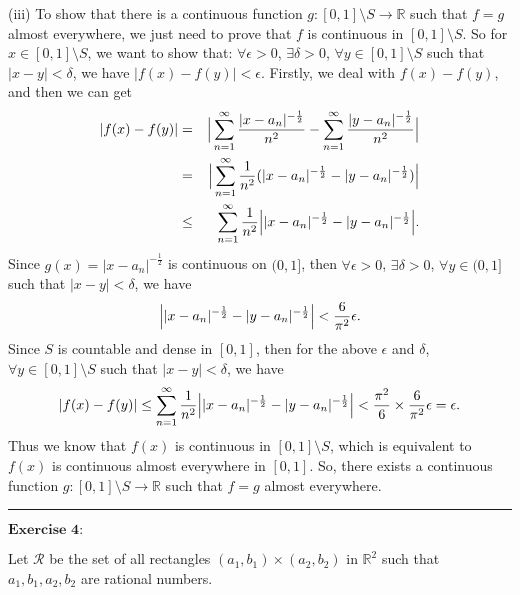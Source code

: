 \documentclass[12pt,a4paper]{ctexart}
\begin{document}
(iii) To show that there is a continuous function $g : [0, 1] \setminus S \rightarrow \mathbb{R}$ such that $f = g$ almost everywhere, we just need to prove that $f$ is continuous in $[0, 1] \setminus S$. So for $x \in [0, 1] \setminus S$, we want to show that: $\forall \epsilon > 0$, $\exists \delta > 0$, $\forall y \in [0, 1] \setminus S$ such that $|x - y| < \delta$, we have $|f(x) - f(y)| < \epsilon$. Firstly, we deal with $f(x) - f(y)$, and then we can get
\begin{eqnarray*}
|f(x) - f(y)| & =& \Big{|} \sum_{n = 1}^{\infty} \frac{|x - a_{n}|^{- \frac{1}{2}}}{n^{2}} - \sum_{n = 1}^{\infty} \frac{|y - a_{n}|^{- \frac{1}{2}}}{n^{2}} \Big{|} \\
& = &  \Big{|} \sum_{n = 1}^{\infty} \frac{1}{n^{2}} (|x - a_{n}|^{- \frac{1}{2}} - |y - a_{n}|^{- \frac{1}{2}}) \Big{|} \\
& \leq & \sum_{n = 1}^{\infty} \frac{1}{n^{2}}  \Big{|} |x - a_{n}|^{- \frac{1}{2}} - |y - a_{n}|^{- \frac{1}{2}} \Big{|}.
\end{eqnarray*}
Since $g(x) = |x - a_{n}|^{- \frac{1}{2}}$ is continuous on $(0, 1]$, then $\forall \epsilon > 0$, $\exists \delta > 0$, $\forall y \in (0, 1]$ such that $|x - y| < \delta$, we have 
\begin{equation*}
   \Big{|} |x - a_{n}|^{- \frac{1}{2}} - |y - a_{n}|^{- \frac{1}{2}} \Big{|} < \frac{6}{\pi^{2}} \epsilon.
\end{equation*}
Since $S$ is countable and dense in $[0, 1]$, then for the above $\epsilon$ and $\delta$, $\forall y \in [0, 1] \setminus S$ such that $|x - y| < \delta$, we have
\begin{equation*}
   |f(x) - f(y)| \leq \sum_{n = 1}^{\infty} \frac{1}{n^{2}}  \Big{|} |x - a_{n}|^{- \frac{1}{2}} - |y - a_{n}|^{- \frac{1}{2}} \Big{|} < \frac{\pi^{2}}{6} \times \frac{6}{\pi^{2}} \epsilon = \epsilon.
\end{equation*}
Thus we know that $f(x)$ is continuous in $[0, 1] \setminus S$, which is equivalent to $f(x)$ is continuous almost everywhere in $[0, 1]$. So, there exists a continuous function $g : [0, 1] \setminus S \rightarrow \mathbb{R}$ such that $f = g$ almost everywhere.


\noindent\rule[0.25\baselineskip]{\textwidth}{0.5pt}

\vspace{8pt}

$\textbf{Exercise 4:}$

Let $\mathcal{R}$ be the set of all rectangles $(a_{1}, b_{1}) \times (a_{2}, b_{2})$ in $\mathbb{R}^{2}$ such that $a_{1}, b_{1}, a_{2}, b_{2}$ are rational numbers.
\end{document}
